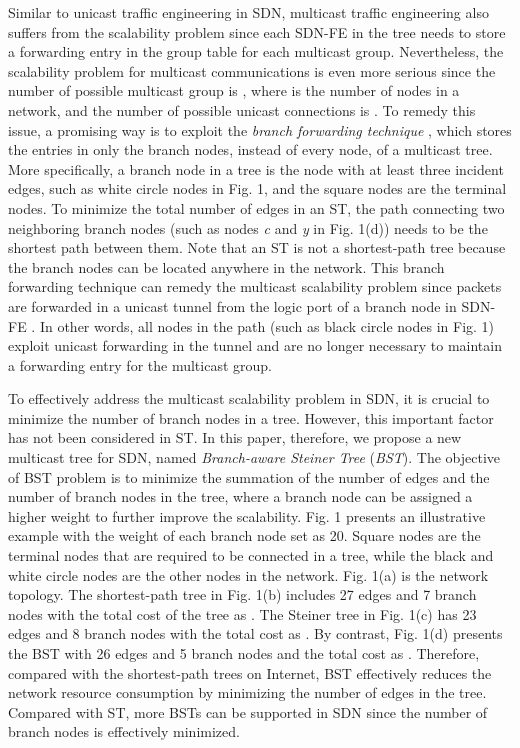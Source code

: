 \documentclass[conference]{IEEEtran}
\begin{document}
Similar to unicast traffic engineering in SDN, multicast traffic engineering
also suffers from the scalability problem since each SDN-FE in the tree
needs to store a forwarding entry in the group table for each multicast
group. Nevertheless, the scalability problem for multicast communications is
even more serious since the number of possible multicast group is , where  is the number of nodes in a network, and the number of possible
unicast connections is . To remedy this issue, a promising way is
to exploit the \textit{branch forwarding technique} \cite{Yang2008, YangLiao2008, Tian1998, Stoica2000, Wong2000}, which stores the
entries in only the branch nodes, instead of every node, of a multicast
tree. More specifically, a branch node in a tree is the node with at least
three incident edges, such as white circle nodes in Fig. 1, and the square nodes are the terminal nodes. To
minimize the total number of edges in an ST, the path connecting two
neighboring branch nodes (such as nodes \textit{c} and \textit{y} in Fig. 1(d))
needs to be the shortest path between them. Note that an ST is not a
shortest-path tree because the branch nodes can be located anywhere in the
network. This branch forwarding technique can remedy the multicast
scalability problem since packets are forwarded in a unicast tunnel from the
logic port of a branch node in SDN-FE \cite{OpenFlow2013}. In other words, all nodes
in the path (such as black circle nodes in
Fig. 1) exploit unicast forwarding in the tunnel and are no longer necessary to maintain a forwarding entry for the multicast
group.

To effectively address the multicast scalability problem in SDN, it is
crucial to minimize the number of branch nodes in a tree. However, this
important factor has not been considered in ST. In this paper, therefore, we
propose a new multicast tree for SDN, named \textit{Branch-aware Steiner Tree} (\textit{BST}). The objective of BST problem is to minimize the summation
of the number of edges and the number of branch nodes in the tree, where a
branch node can be assigned a higher weight to further improve the
scalability. Fig. 1 presents an illustrative example with the weight of each
branch node set as 20. Square nodes are the terminal nodes that are required
to be connected in a tree, while the black and white circle nodes are the
other nodes in the network. Fig. 1(a) is the network topology. The
shortest-path tree in Fig. 1(b) includes 27 edges and 7 branch nodes with
the total cost of the tree as . The Steiner tree in Fig.
1(c) has 23 edges and 8 branch nodes with the total cost as . By contrast, Fig. 1(d) presents the BST with 26 edges and 5 branch
nodes and the total cost as . Therefore, compared with the
shortest-path trees on Internet, BST effectively reduces the network
resource consumption by minimizing the number of edges in the tree. Compared
with ST, more BSTs can be supported in SDN since the number of branch nodes
is effectively minimized.
\end{document}
